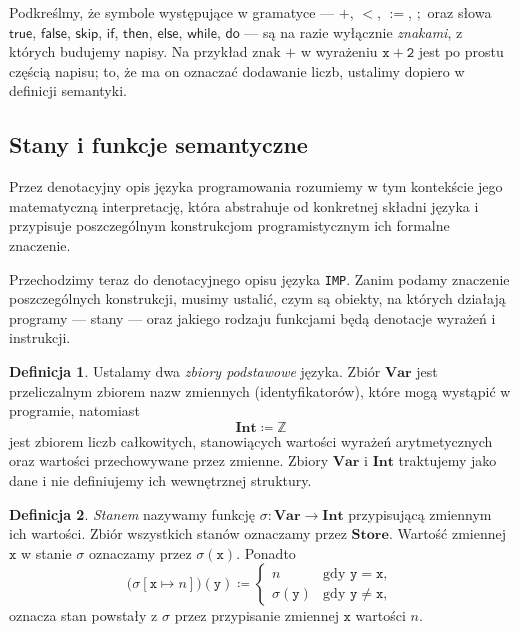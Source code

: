 \documentclass[11pt,a4paper]{article}
\theoremstyle{definition}
\newtheorem{definicja}{Definicja}[section]
\theoremstyle{plain}
\newcommand{\Store}{\textbf{Store}}
\newcommand{\Int}{\textbf{Int}}
\newcommand{\Var}{\textbf{Var}}
\newcommand{\kw}[1]{\ensuremath{\mathsf{#1}}} %
\begin{document}
Podkreślmy, że symbole występujące w gramatyce --- $+$, $<$, $:=$, $;$
oraz słowa $\kw{true}$, $\kw{false}$, $\kw{skip}$, $\kw{if}$, $\kw{then}$,
$\kw{else}$, $\kw{while}$, $\kw{do}$ --- są na razie wyłącznie
\emph{znakami}, z których budujemy napisy. Na przykład znak $+$ w wyrażeniu
$\mathtt{x}+\mathtt{2}$ jest po prostu częścią napisu; to, że ma on oznaczać dodawanie liczb,
ustalimy dopiero w definicji semantyki.

\subsection{Stany i funkcje semantyczne}\label{subsec:stany}

Przez denotacyjny opis języka programowania rozumiemy w tym kontekście jego
matematyczną interpretację, która abstrahuje od konkretnej składni języka
i przypisuje poszczególnym konstrukcjom programistycznym ich formalne znaczenie.

Przechodzimy teraz do denotacyjnego opisu języka \texttt{IMP}. Zanim
podamy znaczenie poszczególnych konstrukcji, musimy ustalić, czym są
obiekty, na których działają programy --- stany --- oraz jakiego rodzaju
funkcjami będą denotacje wyrażeń i instrukcji.

\begin{definicja}
	Ustalamy dwa \emph{zbiory podstawowe} języka. Zbiór
	$\Var$ jest przeliczalnym zbiorem nazw zmiennych (identyfikatorów),
	które mogą wystąpić w programie, natomiast
	\[
	\Int\coloneqq \mathbb{Z}
	\]
	jest zbiorem liczb całkowitych, stanowiących wartości wyrażeń
	arytmetycznych oraz wartości przechowywane przez zmienne. Zbiory
	$\Var$ i $\Int$ traktujemy jako dane i nie definiujemy ich
	wewnętrznej struktury.
\end{definicja}

\begin{definicja}\label{def:store}
	\emph{Stanem} nazywamy funkcję
	$\sigma:\Var \to \Int$ przypisującą zmiennym ich wartości.
	Zbiór wszystkich stanów oznaczamy przez $\Store$. Wartość zmiennej $\mathtt{x}$
	w stanie $\sigma$ oznaczamy przez $\sigma(\mathtt{x})$. Ponadto
	\[
	\big(\sigma[\mathtt{x}\mapsto n]\big)(\mathtt{y})\coloneqq 
	\begin{cases}
		n & \text{gdy } \mathtt{y}=\mathtt{x},\\
		\sigma(\mathtt{y}) & \text{gdy } \mathtt{y}\neq \mathtt{x},
	\end{cases}
	\]
	oznacza stan powstały z $\sigma$ przez przypisanie zmiennej $\mathtt{x}$ wartości
	$n$.
\end{definicja}
\end{document}
